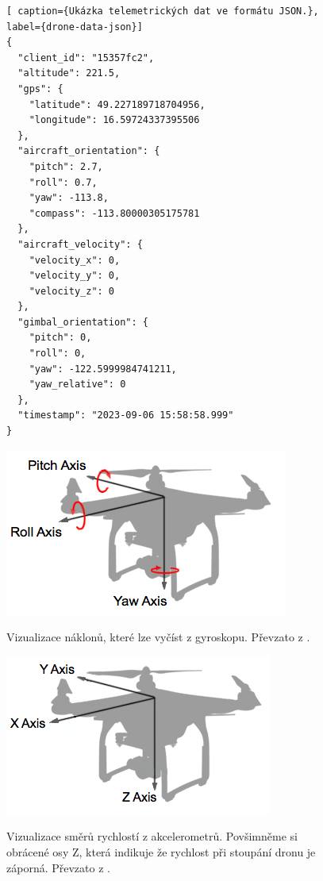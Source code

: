 \begin{figure}[ht]
  \begin{minipage}{0.5\textwidth}
    \begin{lstlisting}[ caption={Ukázka telemetrických dat ve formátu JSON.}, label={drone-data-json}]
{
  "client_id": "15357fc2",
  "altitude": 221.5,
  "gps": {
    "latitude": 49.227189718704956,
    "longitude": 16.59724337395506
  },
  "aircraft_orientation": {
    "pitch": 2.7,
    "roll": 0.7,
    "yaw": -113.8,
    "compass": -113.80000305175781
  },
  "aircraft_velocity": {
    "velocity_x": 0,
    "velocity_y": 0,
    "velocity_z": 0
  },
  "gimbal_orientation": {
    "pitch": 0,
    "roll": 0,
    "yaw": -122.5999984741211,
    "yaw_relative": 0
  },
  "timestamp": "2023-09-06 15:58:58.999"
}
\end{lstlisting}
  \end{minipage}%
  \hfill
  \begin{minipage}{0.45\textwidth}
    \centering
    \includegraphics[width=\textwidth]{obrazky-figures/gymbal.png}
    \caption{Vizualizace náklonů, které lze vyčíst z gyroskopu. Převzato z \cite{Flight-Control-dji}. }
    \label{pic:gymbal}
    \vspace{20pt}
    \includegraphics[width=\textwidth]{obrazky-figures/velocity.png}
    \caption{Vizualizace směrů rychlostí z akcelerometrů. Povšimněme si obrácené osy Z, která indikuje že rychlost při stoupání dronu je záporná. Převzato z \cite{Flight-Control-dji}.}
    \label{pic:velocity}
  \end{minipage}
\end{figure}
    
